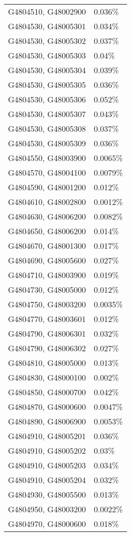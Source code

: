 \begin{longtable}[]{@{}ll@{}}
G4804510, G48002900 & 0.036\% \\
G4804530, G48005301 & 0.034\% \\
G4804530, G48005302 & 0.037\% \\
G4804530, G48005303 & 0.04\% \\
G4804530, G48005304 & 0.039\% \\
G4804530, G48005305 & 0.036\% \\
G4804530, G48005306 & 0.052\% \\
G4804530, G48005307 & 0.043\% \\
G4804530, G48005308 & 0.037\% \\
G4804530, G48005309 & 0.036\% \\
G4804550, G48003900 & 0.0065\% \\
G4804570, G48004100 & 0.0079\% \\
G4804590, G48001200 & 0.012\% \\
G4804610, G48002800 & 0.0012\% \\
G4804630, G48006200 & 0.0082\% \\
G4804650, G48006200 & 0.014\% \\
G4804670, G48001300 & 0.017\% \\
G4804690, G48005600 & 0.027\% \\
G4804710, G48003900 & 0.019\% \\
G4804730, G48005000 & 0.012\% \\
G4804750, G48003200 & 0.0035\% \\
G4804770, G48003601 & 0.012\% \\
G4804790, G48006301 & 0.032\% \\
G4804790, G48006302 & 0.027\% \\
G4804810, G48005000 & 0.013\% \\
G4804830, G48000100 & 0.002\% \\
G4804850, G48000700 & 0.042\% \\
G4804870, G48000600 & 0.0047\% \\
G4804890, G48006900 & 0.0053\% \\
G4804910, G48005201 & 0.036\% \\
G4804910, G48005202 & 0.03\% \\
G4804910, G48005203 & 0.034\% \\
G4804910, G48005204 & 0.032\% \\
G4804930, G48005500 & 0.013\% \\
G4804950, G48003200 & 0.0022\% \\
G4804970, G48000600 & 0.018\% \\

\end{longtable}
